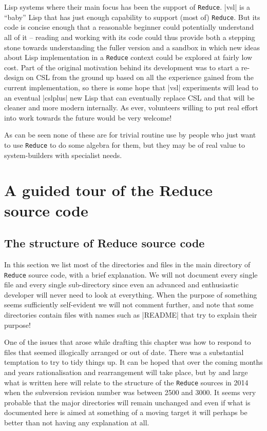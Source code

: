 \documentclass[12pt,twoside,openright]{memoir}
\newcommand{\reduce}{\texttt{Reduce}\xspace}
\begin{document}
\begin{itemize}
Lisp systems where their main focus has been the support of \reduce. |vsl|
is a ``baby'' Lisp that has just enough capability to support (most of)
\reduce. But its code is concise enough that a reasonable beginner could
potentially understand all of it -- reading and working with its code could
thus provide both a stepping stone towards understanding the fuller version
and a sandbox in which new ideas about Lisp implementation in a \reduce
context could be explored at fairly low cost. Part of the original motivation
behind its development was to start a re-design on CSL from the ground up
based on all the experience gained from the current implementation, so there is
some hope that |vsl| experiments will lead to an eventual |cslplus| new Lisp
that can eventually replace CSL and that will be cleaner and more modern
internally. As ever, volunteers willing to put real effort into work towards the
future would be very welcome!
\end{itemize}
As can be seen none of these are for trivial routine use by people who just
want to use \reduce to do some algebra for them, but they may be of real value
to system-builders with specialist needs.

\chapter[The Reduce source code]{A guided tour of the Reduce
  source code}

\section{The structure of Reduce source code}

In this section we list most of the directories and files in the main directory
of \reduce source code, with a brief explanation. We will not document every
single file and every single sub-directory since even an advanced and
enthusiastic developer will never need to look at everything.  When the purpose
of something seems sufficiently self-evident we will not comment further, and
note that some directories contain files with names such as |README| that try
to explain their purpose!

One of the issues that arose while drafting this chapter was how to
respond to files that seemed illogically arranged or out of date. There was
a substantial temptation to try to tidy things up. It can be hoped
that over the coming months and years rationalisation and rearrangement
will take place, but by and large what is written here will relate to the
structure of the \reduce sources in 2014 when the subversion revision
number was between 2500 and 3000. It seems very probable that the major
directories will remain unchanged and even if what is documented here is
aimed at something of a moving target it will perhaps be better than not having
any explanation at all.
\end{document}
